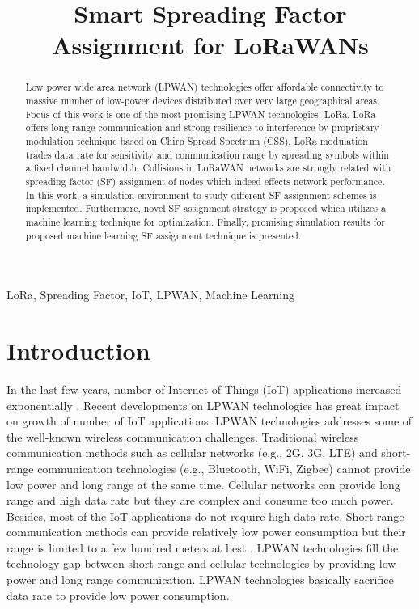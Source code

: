 \documentclass[conference]{IEEEtran}
\begin{document}
\title{Smart Spreading Factor Assignment for LoRaWANs}


\author{
}
\maketitle


\begin{abstract}
Low power wide area network (LPWAN) technologies offer affordable connectivity to massive number of low-power devices distributed over very large geographical areas. Focus of this work is one of the most promising LPWAN technologies: LoRa. LoRa offers long range communication and strong resilience to interference by proprietary modulation technique based on Chirp Spread Spectrum (CSS). LoRa modulation trades data rate for sensitivity and communication range by spreading symbols within a fixed channel bandwidth. Collisions in LoRaWAN networks are strongly related with spreading factor (SF) assignment of nodes which indeed effects network performance. In this work, a simulation environment to study different SF assignment schemes is implemented. Furthermore, novel SF assignment strategy is proposed which utilizes a machine learning technique for optimization. Finally, promising simulation results for proposed machine learning SF assignment technique is presented.
\end{abstract}


\begin{IEEEkeywords}
LoRa, Spreading Factor, IoT, LPWAN, Machine Learning
\end{IEEEkeywords}


\section{Introduction}
\par In the last few years, number of Internet of Things (IoT) applications increased exponentially \cite{7721743}. Recent developments on LPWAN technologies has great impact on growth of number of IoT applications. LPWAN technologies addresses some of the well-known wireless communication challenges. Traditional wireless communication methods such as cellular networks (e.g., 2G, 3G, LTE) and short-range communication technologies (e.g., Bluetooth, WiFi, Zigbee) cannot provide low power and long range at the same time. Cellular networks can provide long range and high data rate but they are complex and consume too much power. Besides, most of the IoT applications do not require high data rate. Short-range communication methods can provide relatively low power consumption but their range is limited to a few hundred meters at best \cite{7815384}. LPWAN technologies fill the technology gap between short range and cellular technologies by providing low power and long range communication. LPWAN technologies basically sacrifice data rate to provide low power consumption.
\end{document}
